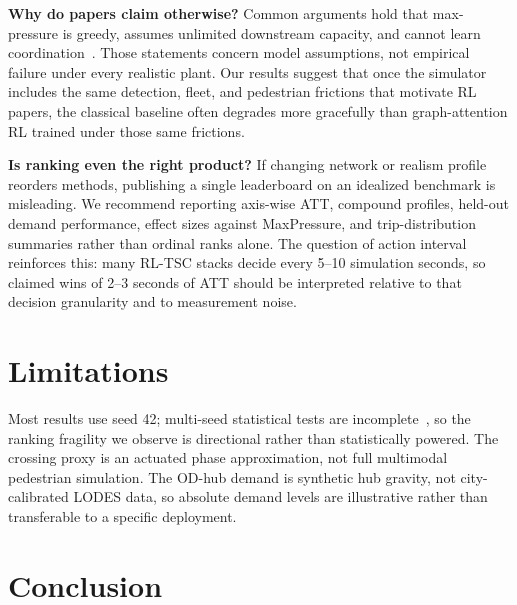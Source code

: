 \documentclass[conference]{IEEEtran}
\begin{document}
\textbf{Why do papers claim otherwise?} Common arguments hold that max-pressure is greedy, assumes unlimited downstream capacity, and cannot learn coordination~\cite{wei2019presslight, wei2019colight, wei2019survey}. Those statements concern model assumptions, not empirical failure under every realistic plant. Our results suggest that once the simulator includes the same detection, fleet, and pedestrian frictions that motivate RL papers, the classical baseline often degrades more gracefully than graph-attention RL trained under those same frictions.

\textbf{Is ranking even the right product?} If changing network or realism profile reorders methods, publishing a single leaderboard on an idealized benchmark is misleading. We recommend reporting axis-wise ATT, compound profiles, held-out demand performance, effect sizes against MaxPressure, and trip-distribution summaries rather than ordinal ranks alone. The question of action interval reinforces this: many RL-TSC stacks decide every 5--10 simulation seconds, so claimed wins of 2--3 seconds of ATT should be interpreted relative to that decision granularity and to measurement noise.

\section{Limitations}

Most results use seed 42; multi-seed statistical tests are incomplete~\cite{colas2018seeds}, so the ranking fragility we observe is directional rather than statistically powered. The crossing proxy is an actuated phase approximation, not full multimodal pedestrian simulation. The OD-hub demand is synthetic hub gravity, not city-calibrated LODES data, so absolute demand levels are illustrative rather than transferable to a specific deployment.

\section{Conclusion}
\end{document}
